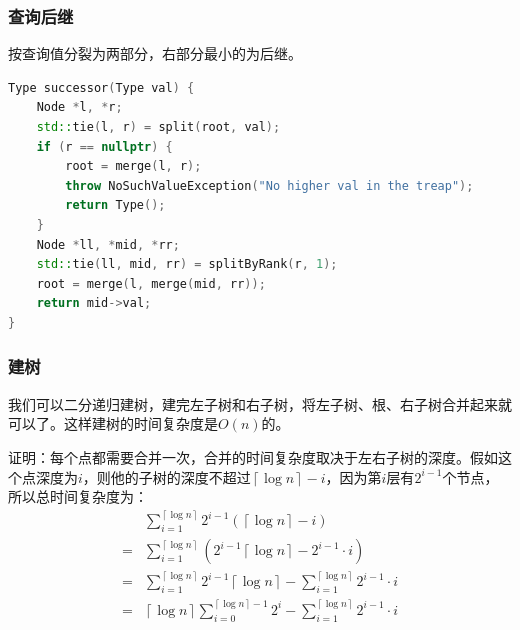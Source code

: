 \documentclass[utf8]{ctexbeamer}
\begin{document}
    \begin{frame}[fragile]
        \frametitle{查询后继}
        按查询值分裂为两部分，右部分最小的为后继。
        \begin{lstlisting}[language=c++]
Type successor(Type val) {
    Node *l, *r;
    std::tie(l, r) = split(root, val);
    if (r == nullptr) {
        root = merge(l, r);
        throw NoSuchValueException("No higher val in the treap");
        return Type();
    }
    Node *ll, *mid, *rr;
    std::tie(ll, mid, rr) = splitByRank(r, 1);
    root = merge(l, merge(mid, rr));
    return mid->val;
}
        \end{lstlisting}
    \end{frame}

    \begin{frame}
        \frametitle{建树}
        我们可以二分递归建树，建完左子树和右子树，将左子树、根、右子树合并起来就可以了。这样建树的时间复杂度是$O(n)$的。
        
        证明：每个点都需要合并一次，合并的时间复杂度取决于左右子树的深度。假如这个点深度为$i$，则他的子树的深度不超过$\left\lceil\log n\right\rceil-i$，因为第$i$层有$2^{i-1}$个节点，所以总时间复杂度为：
        \begin{align}
             &\sum_{i=1}^{\left\lceil\log n\right\rceil}2^{i-1}(\left\lceil\log n\right\rceil-i)\nonumber\\
            =&\sum_{i=1}^{\left\lceil\log n\right\rceil}(2^{i-1}\left\lceil\log n\right\rceil-2^{i-1}\cdot i)\nonumber\\
            =&\sum_{i=1}^{\left\lceil\log n\right\rceil}2^{i-1}\left\lceil\log n\right\rceil-\sum_{i=1}^{\left\lceil\log n\right\rceil}2^{i-1}\cdot i\nonumber\\
            =&\left\lceil\log n\right\rceil\sum_{i=0}^{\left\lceil\log n\right\rceil-1}2^i-\sum_{i=1}^{\left\lceil\log n\right\rceil}2^{i-1}\cdot i\nonumber
        \end{align}
    \end{frame}
\end{document}

